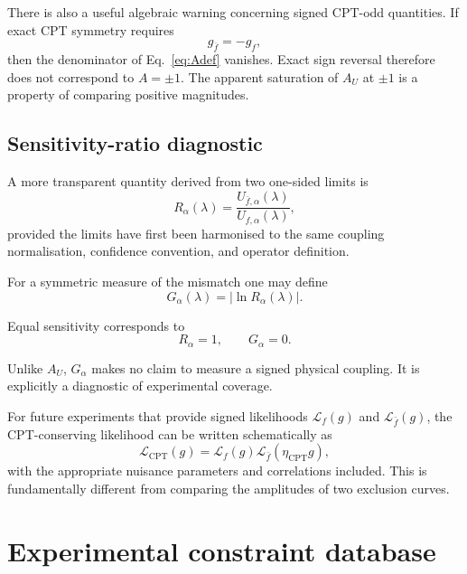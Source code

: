 \documentclass[aps,prd,reprint,superscriptaddress,nofootinbib]{revtex4-2}
\newcommand{\CPT}{\mathrm{CPT}}
\begin{document}
	There is also a useful algebraic warning concerning signed
	CPT-odd quantities. If exact CPT symmetry requires
	\begin{equation}
		g_{\bar f}=-g_f,
	\end{equation}
	then the denominator of Eq.~\eqref{eq:Adef} vanishes. Exact
	sign reversal therefore does not correspond to $A=\pm1$. The apparent
	saturation of $A_U$ at $\pm1$ is a property of comparing positive
	magnitudes.
	
	\subsection{Sensitivity-ratio diagnostic}
	
	A more transparent quantity derived from two one-sided limits is
	\begin{equation}
		R_\alpha(\lambda)
		=
		\frac{U_{\bar f,\alpha}(\lambda)}
		{U_{f,\alpha}(\lambda)},
		\label{eq:R}
	\end{equation}
	provided the limits have first been harmonised to the same coupling
	normalisation, confidence convention, and operator definition.
	
	For a symmetric measure of the mismatch one may define
	\begin{equation}
		G_\alpha(\lambda)
		=
		\left|\ln R_\alpha(\lambda)\right|.
		\label{eq:G}
	\end{equation}
	
	Equal sensitivity corresponds to
	\begin{equation}
		R_\alpha=1,
		\qquad
		G_\alpha=0.
	\end{equation}
	
	Unlike $A_U$, $G_\alpha$ makes no claim to measure a signed physical
	coupling. It is explicitly a diagnostic of experimental coverage.
	
	For future experiments that provide signed likelihoods
	$\mathcal L_f(g)$ and $\mathcal L_{\bar f}(g)$, the CPT-conserving
	likelihood can be written schematically as
	\begin{equation}
		\mathcal L_{\CPT}(g)
		=
		\mathcal L_f(g)
		\mathcal L_{\bar f}(\eta_\CPT g),
	\end{equation}
	with the appropriate nuisance parameters and correlations included.
	This is fundamentally different from comparing the amplitudes of two
	exclusion curves.
	
	\section{Experimental constraint database}
	
\end{document}
